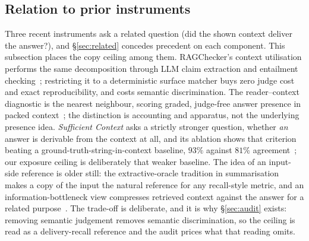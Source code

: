 \documentclass[10pt,twocolumn]{article}
\begin{document}
\subsection{Relation to prior instruments}\label{sec:ceiling-prior}
Three recent instruments ask a related question (did the shown context deliver the answer?), and \S\ref{sec:related} concedes precedent on each component. This subsection places the copy ceiling among them. RAGChecker's context utilisation performs the same decomposition through LLM claim extraction and entailment checking~\cite{ragchecker2024}; restricting it to a deterministic surface matcher buys zero judge cost and exact reproducibility, and costs semantic discrimination. The reader--context diagnostic is the nearest neighbour, scoring graded, judge-free answer presence in packed context~\cite{readercontext2026}; the distinction is accounting and apparatus, not the underlying presence idea. \emph{Sufficient Context} asks a strictly stronger question, whether \emph{an} answer is derivable from the context at all, and its ablation shows that criterion beating a ground-truth-string-in-context baseline, $93\%$ against $81\%$ agreement~\cite{sufficientcontext2025}; our exposure ceiling is deliberately that weaker baseline. The idea of an input-side reference is older still: the extractive-oracle tradition in summarisation~\cite{see2017pointergenerator,narayan2018xsum,xu2019extractive} makes a copy of the input the natural reference for any recall-style metric, and an information-bottleneck view compresses retrieved context against the answer for a related purpose~\cite{zhu2024ibrag}. The trade-off is deliberate, and it is why \S\ref{sec:audit} exists: removing semantic judgement removes semantic discrimination, so the ceiling is read as a delivery-recall reference and the audit prices what that reading omits.
\end{document}
